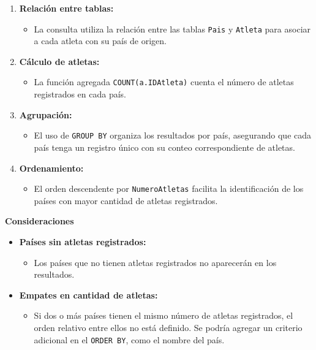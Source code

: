 \begin{enumerate}
   \item \textbf{Relación entre tablas:}
   \begin{itemize}
       \item La consulta utiliza la relación entre las tablas \texttt{Pais} y \texttt{Atleta} para asociar a cada atleta con su país de origen.
   \end{itemize}
   
   \item \textbf{Cálculo de atletas:}
   \begin{itemize}
       \item La función agregada \texttt{COUNT(a.IDAtleta)} cuenta el número de atletas registrados en cada país.
   \end{itemize}
   
   \item \textbf{Agrupación:}
   \begin{itemize}
       \item El uso de \texttt{GROUP BY} organiza los resultados por país, asegurando que cada país tenga un registro único con su conteo correspondiente de atletas.
   \end{itemize}
   
   \item \textbf{Ordenamiento:}
   \begin{itemize}
       \item El orden descendente por \texttt{NumeroAtletas} facilita la identificación de los países con mayor cantidad de atletas registrados.
   \end{itemize}
\end{enumerate}

\textbf{Consideraciones}

\begin{itemize}
   \item \textbf{Países sin atletas registrados:}
   \begin{itemize}
       \item Los países que no tienen atletas registrados no aparecerán en los resultados.
   \end{itemize}
   \item \textbf{Empates en cantidad de atletas:}
   \begin{itemize}
       \item Si dos o más países tienen el mismo número de atletas registrados, el orden relativo entre ellos no está definido. Se podría agregar un criterio adicional en el \texttt{ORDER BY}, como el nombre del país.
   \end{itemize}
\end{itemize}

